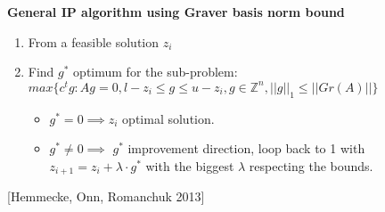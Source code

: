 \textbf{General IP algorithm using Graver basis norm bound}
\begin{enumerate}
    \item From a feasible solution $z_i$
    \item Find $g^*$ optimum for the sub-problem: \vspace{4pt}\\
          $max\{c^tg : Ag = 0, l-z_i \leq g \leq u-z_i, g \in \mathbb{Z}^n, ||g||_1 \leq ||Gr(A)|| \}$ \vspace{4pt}
    \begin{itemize}
        \item $g^* = 0 \implies z_i$ optimal solution.
        \item $g^* \neq 0 \implies$ $g^*$ improvement direction, loop back to 1 with $z_{i+1} = z_i + \lambda \cdot g^*$ with the biggest $\lambda$ respecting the bounds.
    \end{itemize}
\end{enumerate}
\hspace{15pt} [Hemmecke, Onn, Romanchuk 2013]


        